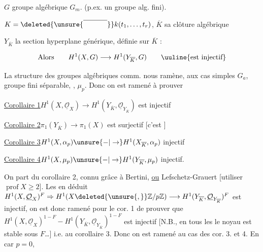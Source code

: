 $G$ groupe algébrique   $G_{m}$. (p.ex. un groupe alg. fini).

$K=\deleted{\unsure{\overline{\phantom{k(t_1,t_r)}}}}k(t_{1},\ldots,t_{r})$, $\overline K$ sa clôture algébrique

$Y_{\overline K}$ la section hyperplane générique, définie sur $\overline K$ :

\[
\text{Alors}\qquad H^{1}(X,G)\longrightarrow H^{1}(Y_{\overline K},G)\qquad\text{\uuline{est injectif}}
\]

La structure des groupes algébriques comm. nous ramène, aux cas simples $G_{a}$,  groupe fini séparable, , $\mu_{p}$. Donc on est ramené à prouver


\uline{Corollaire 1}\qquad $H^{1}(X,\underline{\mathcal O}_{X})\longrightarrow H^{1}(Y_{\overline K},\underline{\mathcal O}_{Y_{\overline K}})$ est injectif


\uline{Corollaire 2}\qquad $\pi_{1}(Y_{\overline K})\longrightarrow\pi_{1}(X)$ est surjectif [c'est ]

\uline{Corollaire 3}\qquad $H^{1}(X,\alpha_{p})\unsure{-|\to}H^{1}(X_{\overline K},\alpha_{p})$ injectif

\uline{Corollaire 4}\qquad $H^{1}(X,\mu_{p})\unsure{-|\to}H^{1}(Y_{\overline K},\mu_{p})$ injectif.

On part du corollaire 2, connu grâce à Bertini, \uline{ou} Lefschetz-Grauert [utiliser  $\operatorname{prof}X\geq2$]. Les en déduit $H^{1}(X,\underline{\mathcal O}_{X})^{F}\Rightarrow H^{1}(X\deleted{\unsure{,}}\mathbb Z/p\mathbb Z)\longrightarrow H^{1}(Y_{\overline K},\underline{\mathcal O}_{Y_{\overline K}})^{F}$ est injectif, on est donc ramené pour le cor. 1 de prouver que $H^{1}(X,\underline{\mathcal O}_{X})^{1-F}-H^{1}(Y_{\overline K},\underline{\mathcal O}_{Y_{\overline K}})^{1-F}$ est injectif [N.B., en tous les \unsure{;} le noyau est stable sous $F$\ldots] i.e. au corollaire 3. Donc on est ramené \inserted{[en car. $p>0$]}  au cas des cor. 3. et 4. En car $p=0$,


